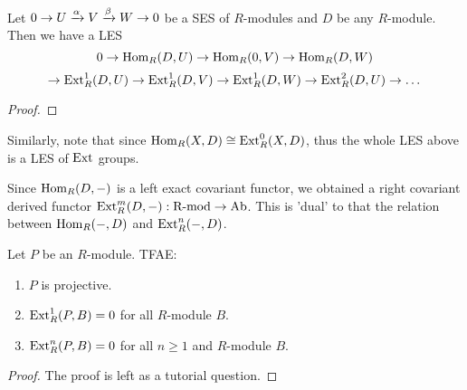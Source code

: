 \begin{thm}
    Let $0\to U \xrightarrow{\alpha} V \xrightarrow{\beta} W \to 0$ be a SES of $R$-modules and $D$ be any $R$-module. Then we have a LES 
    \[0 \to \operatorname{Hom}_R(D,U) \to \operatorname{Hom}_R(0,V)\to \operatorname{Hom}_R(D,W)\]
    \[\to \operatorname{Ext}_R^1 (D,U)\to \operatorname{Ext}_R^1(D,V)\to \operatorname{Ext}_R^1(D,W)\to \operatorname{Ext}_R^2(D,U)\to \dots\]
\end{thm}
\begin{proof}
\end{proof}

\begin{re}
    Similarly, note that since $\operatorname{Hom}_R(X,D)\cong \operatorname{Ext}_R^0(X,D)$, thus the whole LES above is a LES of $\operatorname{Ext}$ groups.
\end{re}

\medskip

\begin{re}
    Since $\operatorname{Hom}_R(D,-)$ is a left exact covariant functor, we obtained a right covariant derived functor $\operatorname{Ext}_R^m(D,-):\text{R-mod} \to \text{Ab}$. This is 'dual' to that the relation between $\operatorname{Hom}_R(-,D)$ and $\operatorname{Ext}_R^n(-,D)$.
\end{re}

\medskip

\begin{thm}
    Let $P$ be an $R$-module. TFAE:
    \begin{enumerate}
        \item $P$ is projective.
        \item $\operatorname{Ext}_R^1(P,B)=0$ for all $R$-module $B$.
        \item $\operatorname{Ext}_R^n(P,B)=0$ for all $n\geq 1$ and $R$-module $B$.
    \end{enumerate}
\end{thm}
\begin{proof}
    The proof is left as a tutorial question.
\end{proof}

